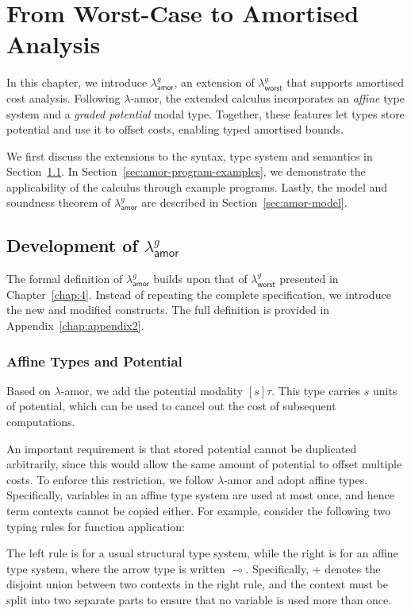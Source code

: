 \chapter{From Worst-Case to Amortised Analysis}
\label{chap: chap6}

In this chapter, we introduce $\lambda^g_{\mathsf{amor}}$, an extension of $\lambda^g_{\mathsf{worst}}$ that supports amortised cost analysis. 
Following $\lambda$-amor, the extended calculus incorporates an \emph{affine} type system and a \emph{graded potential} modal type. 
Together, these features let types store potential and use it to offset costs, enabling typed amortised bounds.

We first discuss the extensions to the syntax, type system and semantics in Section~\ref{sec:amor-overview}.
In Section~\ref{sec:amor-program-examples}, we demonstrate the applicability of the calculus through example programs.
Lastly, the model and soundness theorem of $\lambda^g_{\mathsf{amor}}$ are described in Section~\ref{sec:amor-model}.


\section{Development of $\lambda^g_{\mathsf{amor}}$}
\label{sec:amor-overview}
The formal definition of $\lambda^g_{\mathsf{amor}}$ builds upon that of $\lambda^g_{\mathsf{worst}}$ presented in Chapter~\ref{chap:4}. Instead of repeating the complete specification, we introduce the new and modified constructs. 
The full definition is provided in Appendix~\ref{chap:appendix2}.


\subsection{Affine Types and Potential}
Based on $\lambda$-amor, we add the potential modality $[s] \tau$. This type carries $s$ units of potential, which can be used to cancel out the cost of subsequent computations.

An important requirement is that stored potential cannot be duplicated arbitrarily, 
since this would allow the same amount of potential to offset multiple costs.
To enforce this restriction, we follow $\lambda$-amor and adopt affine types.
Specifically, variables in an affine type system are used at most once, and hence term contexts cannot be 
copied either. For example, consider the following two typing rules for function application:
The left rule is for a usual structural type system, while the right is for an affine type system, where the arrow type is written $\multimap$. Specifically, 
+ denotes the disjoint union between two contexts in the right rule, and the context must be split 
into two separate parts to ensure that no variable is used more than once.

